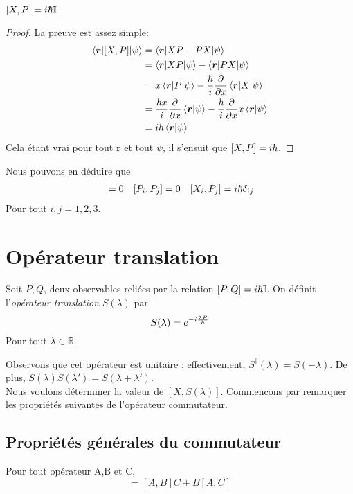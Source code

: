 \documentclass[../Notesdecours.tex]{subfiles}
\begin{document}
\begin{Property} $[X,P] = i\hbar\mathbb{I}$ \end{Property}
\begin{proof}
La preuve est assez simple:
\begin{align*}
	\braket{\bm{r}|[X,P]|\psi} &= \braket{\bm{r}|XP-PX|\psi}\\
	&= \braket{\bm{r}|XP|\psi} - \braket{\bm{r}|PX|\psi}\\
	&= x\braket{\bm{r}|P|\psi} -\frac{\hbar}{i}\frac{\partial}{\partial x}\braket{\bm{r}|X|\psi}\\
	&= \frac{\hbar x}{i}\frac{\partial}{\partial x}\braket{\bm{r}|\psi} - \frac{\hbar}{i} \frac{\partial}{\partial x}x\braket{\bm{r}|\psi}\\
	&= i\hbar \braket{\bm{r}|\psi}
\end{align*}
Cela étant vrai pour tout $\bm{r}$ et tout $\psi$, il s'ensuit que $[X,P] = i\hbar$.
\end{proof}
Nous pouvons en déduire que 
\begin{align}
[X_i,X_j] &= 0 & [P_i,P_j] &= 0 & [X_i,P_j] = i\h\delta_{ij}
\end{align}
Pour tout $i,j = 1,2,3$.

\section{Opérateur translation}
\begin{definition}
	Soit $P,Q$, deux observables reliées par la relation $[P,Q] = i\hbar\mathbb{I}$. On définit l'\emph{opérateur translation} $S(\lambda)$ par
	\begin{equation}
		S(\lambda) = e^{-i\frac{\lambda P}{\hbar}}
	\end{equation}
	Pour tout $\lambda\in\mathbb{R}$.
\end{definition}
Observons que cet opérateur est unitaire : effectivement, $S^\dagger (\lambda) = S(-\lambda)$. De plus, $S(\lambda)S(\lambda') = S(\lambda + \lambda')$.\\

Nous voulons déterminer la valeur de $[X,S(\lambda)]$. Commencons par remarquer les propriétés suivantes de l'opérateur commutateur.
\subsection{Propriétés générales du commutateur}
\begin{Property}
	Pour tout opérateur A,B et C,
	\begin{equation}
		[A,BC] = [A,B]C + B[A,C]
	\end{equation}
\end{Property}
\end{document}
